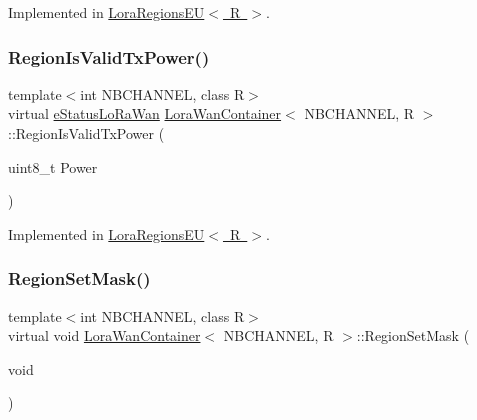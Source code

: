 Implemented in \mbox{\hyperlink{class_lora_regions_e_u_a6dc681bc39f00825ed46e9636d9acf52}{Lora\+Regions\+E\+U$<$ R $>$}}.

\mbox{\label{class_lora_wan_container_a481b6761bc4743086db57fb0adfb4d88}} 
\subsubsection{\texorpdfstring{Region\+Is\+Valid\+Tx\+Power()}{RegionIsValidTxPower()}}
{\footnotesize\ttfamily template$<$int N\+B\+C\+H\+A\+N\+N\+EL, class R$>$ \\
virtual \mbox{\hyperlink{_define_8h_a1cea710adbbf5b02bced8f79cd82f7b9}{e\+Status\+Lo\+Ra\+Wan}} \mbox{\hyperlink{class_lora_wan_container}{Lora\+Wan\+Container}}$<$ N\+B\+C\+H\+A\+N\+N\+EL, R $>$\+::Region\+Is\+Valid\+Tx\+Power (\begin{DoxyParamCaption}\item[{uint8\+\_\+t}]{Power }\end{DoxyParamCaption})\hspace{0.3cm}{\ttfamily [pure virtual]}}



Implemented in \mbox{\hyperlink{class_lora_regions_e_u_ac28aa9ff150676c7f1dd7425dbb6fffa}{Lora\+Regions\+E\+U$<$ R $>$}}.

\mbox{\label{class_lora_wan_container_a1256cfca2973d3cb9114a3f25dfa9aca}} 
\subsubsection{\texorpdfstring{Region\+Set\+Mask()}{RegionSetMask()}}
{\footnotesize\ttfamily template$<$int N\+B\+C\+H\+A\+N\+N\+EL, class R$>$ \\
virtual void \mbox{\hyperlink{class_lora_wan_container}{Lora\+Wan\+Container}}$<$ N\+B\+C\+H\+A\+N\+N\+EL, R $>$\+::Region\+Set\+Mask (\begin{DoxyParamCaption}\item[{void}]{ }\end{DoxyParamCaption})\hspace{0.3cm}{\ttfamily [pure virtual]}}



